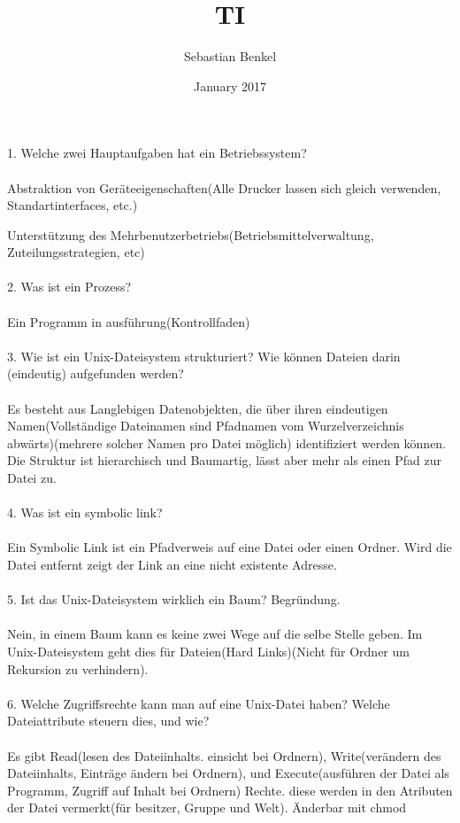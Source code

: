 \documentclass{article}
\title{TI}
\author{Sebastian Benkel}
\date{January 2017}
\begin{document}
1. Welche zwei Hauptaufgaben hat ein Betriebssystem?
\\
\\
Abstraktion von Ger\"ateeigenschaften(Alle Drucker lassen sich gleich verwenden, Standartinterfaces, etc.)

Unterst\"utzung des Mehrbenutzerbetriebs(Betriebsmittelverwaltung, Zuteilungsstrategien, etc)
\\
\\
2. Was ist ein Prozess?
\\
\\
Ein Programm in ausf\"uhrung(Kontrollfaden)
\\
\\
3. Wie ist ein Unix-Dateisystem strukturiert? Wie können Dateien darin (eindeutig) aufgefunden werden?
\\
\\
Es besteht aus Langlebigen Datenobjekten, die \"uber ihren eindeutigen Namen(Vollständige Dateinamen sind Pfadnamen vom Wurzelverzeichnis abwärts)(mehrere solcher Namen pro Datei m\"oglich) identifiziert werden k\"onnen. Die Struktur ist hierarchisch und Baumartig, l\"asst aber mehr als einen Pfad zur Datei zu.
\\
\\
4. Was ist ein symbolic link?
\\
\\
Ein Symbolic Link ist ein Pfadverweis auf eine Datei oder einen Ordner. Wird die Datei entfernt zeigt der Link an eine nicht existente Adresse.
\\      
\\
5. Ist das Unix-Dateisystem wirklich ein Baum? Begründung.
\\
\\
Nein, in einem Baum kann es keine zwei Wege auf die selbe Stelle geben. Im Unix-Dateisystem geht dies f\"ur Dateien(Hard Links)(Nicht f\"ur Ordner um Rekursion zu verhindern).
\\
\\
6. Welche Zugriffsrechte kann man auf eine Unix-Datei haben? Welche Dateiattribute steuern
dies, und wie?
\\
\\
Es gibt Read(lesen des Dateiinhalts. einsicht bei Ordnern), Write(ver\"andern des Dateiinhalts, Eintr\"age \"andern bei Ordnern), und Execute(ausf\"uhren der Datei als Programm, Zugriff auf Inhalt bei Ordnern) Rechte. diese werden in den Atributen der Datei vermerkt(f\"ur besitzer, Gruppe und Welt). \"Anderbar mit chmod
\\
\end{document}
